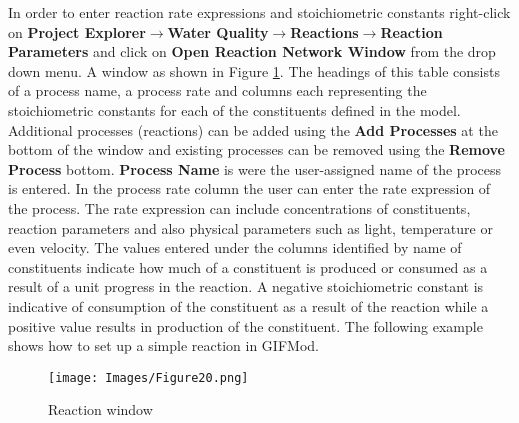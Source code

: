 In order to enter reaction rate expressions and stoichiometric constants right-click on \textbf{Project Explorer}$\rightarrow$\textbf{Water Quality}$\rightarrow$\textbf{Reactions}$\rightarrow$\textbf{Reaction Parameters} and click on \textbf{Open Reaction Network Window} from the drop down menu. A window as shown in Figure \ref{fig:20}. The headings of this table consists of a process name, a process rate and columns each representing the stoichiometric constants for each of the constituents defined in the model. Additional processes (reactions) can be added using the \textbf{Add Processes} at the bottom of the window and existing processes can be removed using the \textbf{Remove Process} bottom. \textbf{Process Name} is were the user-assigned name of the process is entered. In the process rate column the user can enter the rate expression of the process. The rate expression can include concentrations of constituents, reaction parameters and also physical parameters such as light, temperature or even velocity. The values entered under the columns identified by name of constituents indicate how much of a constituent is produced or consumed as a result of a unit progress in the reaction. A negative stoichiometric constant is indicative of consumption of the constituent as a result of the reaction while a positive value results in production of the constituent. The following example shows how to set up a simple reaction in GIFMod. 
\begin{figure}[!ht]\label{fig:20}
\begin{center}
\texttt{[image: Images/Figure20.png]} \\
\caption{Reaction window} 
\end{center}
\end{figure}

